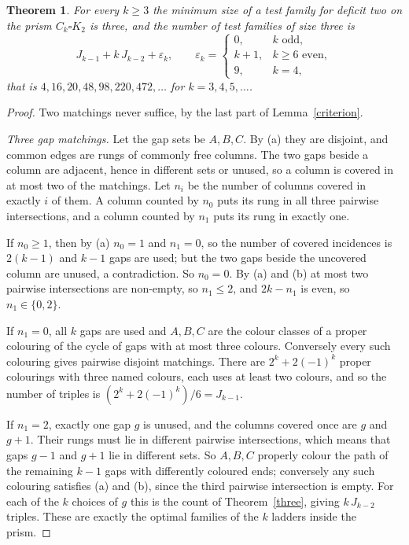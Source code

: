 \documentclass[11pt]{article}
\newtheorem{theorem}{Theorem}
\theoremstyle{remark}
\begin{document}
\begin{theorem}\label{prismthm}
For every \(k\ge3\) the minimum size of a test family for deficit two on the
prism \(C_k\square K_2\) is three, and the number of test families of size
three is
\[
  J_{k-1}+k\,J_{k-2}+\varepsilon_k,\qquad
  \varepsilon_k=\begin{cases}0,&k\text{ odd},\\ k+1,&k\ge6\text{ even},\\ 9,&k=4,\end{cases}
\]
that is \(4,16,20,48,98,220,472,\dots\) for \(k=3,4,5,\dots\).
\end{theorem}
\begin{proof}
Two matchings never suffice, by the last part of Lemma~\ref{criterion}.

\emph{Three gap matchings.} Let the gap sets be \(A,B,C\). By (a) they are
disjoint, and common edges are rungs of commonly free columns. The two gaps
beside a column are adjacent, hence in different sets or unused, so a column
is covered in at most two of the matchings. Let \(n_i\) be the number of
columns covered in exactly \(i\) of them. A column counted by \(n_0\) puts its
rung in all three pairwise intersections, and a column counted by \(n_1\) puts
its rung in exactly one.

If \(n_0\ge1\), then by (a) \(n_0=1\) and \(n_1=0\), so the number of covered
incidences is \(2(k-1)\) and \(k-1\) gaps are used; but the two gaps beside
the uncovered column are unused, a contradiction. So \(n_0=0\). By (a) and
(b) at most two pairwise intersections are non-empty, so \(n_1\le2\), and
\(2k-n_1\) is even, so \(n_1\in\{0,2\}\).

If \(n_1=0\), all \(k\) gaps are used and \(A,B,C\) are the colour classes of
a proper colouring of the cycle of gaps with at most three colours.
Conversely every such colouring gives pairwise disjoint matchings. There are
\(2^k+2(-1)^k\) proper colourings with three named colours, each uses at
least two colours, and so the number of triples is
\((2^k+2(-1)^k)/6=J_{k-1}\).

If \(n_1=2\), exactly one gap \(g\) is unused, and the columns covered once
are \(g\) and \(g+1\). Their rungs must lie in different pairwise
intersections, which means that gaps \(g-1\) and \(g+1\) lie in different
sets. So \(A,B,C\) properly colour the path of the remaining \(k-1\) gaps
with differently coloured ends; conversely any such colouring satisfies (a)
and (b), since the third pairwise intersection is empty. For each of the
\(k\) choices of \(g\) this is the count of Theorem~\ref{three}, giving
\(k\,J_{k-2}\) triples. These are exactly the optimal families of the \(k\)
ladders inside the prism.


\end{proof}
\end{document}
